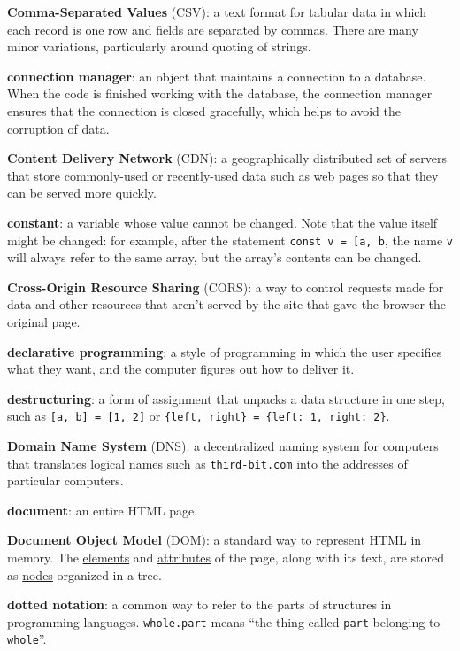 \textbf{Comma-Separated Values} (CSV): a text format for tabular data in
which each record is one row and fields are separated by commas. There
are many minor variations, particularly around quoting of strings.

\textbf{connection manager}: an object that maintains a connection to a
database. When the code is finished working with the database, the
connection manager ensures that the connection is closed gracefully,
which helps to avoid the corruption of data.

\textbf{Content Delivery Network} (CDN): a geographically distributed
set of servers that store commonly-used or recently-used data such as
web pages so that they can be served more quickly.

\textbf{constant}: a variable whose value cannot be changed. Note that
the value itself might be changed: for example, after the statement
\texttt{const\ v\ =\ {[}\textquotesingle{}a\textquotesingle{},\ \textquotesingle{}b\textquotesingle{}{]}},
the name \texttt{v} will always refer to the same array, but the array's
contents can be changed.

\textbf{Cross-Origin Resource Sharing} (CORS): a way to control requests
made for data and other resources that aren't served by the site that
gave the browser the original page.

\textbf{declarative programming}: a style of programming in which the
user specifies what they want, and the computer figures out how to
deliver it.

\textbf{destructuring}: a form of assignment that unpacks a data
structure in one step, such as \texttt{{[}a,\ b{]}\ =\ {[}1,\ 2{]}} or
\texttt{\{left,\ right\}\ =\ \{left:\ 1,\ right:\ 2\}}.

\textbf{Domain Name System} (DNS): a decentralized naming system for
computers that translates logical names such as \texttt{third-bit.com}
into the addresses of particular computers.

\textbf{document}: an entire HTML page.

\textbf{Document Object Model} (DOM): a standard way to represent HTML
in memory. The \protect\hyperlink{g:element}{elements} and
\protect\hyperlink{g:attribute}{attributes} of the page, along with its
text, are stored as \protect\hyperlink{g:node}{nodes} organized in a
tree.

\textbf{dotted notation}: a common way to refer to the parts of
structures in programming languages. \texttt{whole.part} means ``the
thing called \texttt{part} belonging to \texttt{whole}''.


